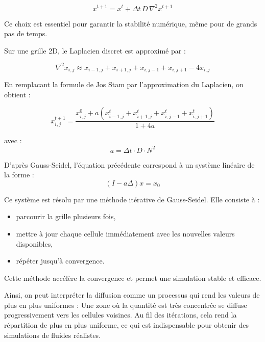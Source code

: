 \documentclass[a4paper]{article}
\begin{document}
\begin{enumerate}
{    \begin{equation*}
    x^{t+1} = x^t + \Delta t \, D \, \nabla^2 x^{t+1}
    \end{equation*}

    Ce choix est essentiel pour garantir la stabilité numérique, même pour de grands pas de temps.
    
    Sur une grille 2D, le Laplacien discret est approximé par :

    \begin{equation*}
    \nabla^2 x_{i,j} \approx x_{i-1,j} + x_{i+1,j} + x_{i,j-1} + x_{i,j+1} - 4x_{i,j}
    \end{equation*}

    En remplacant la formule de Jos Stam par l'approximation du Laplacien, on obtient :

    \begin{equation*}
    x_{i,j}^{t+1} =
    \frac{x_{i,j}^{0} + a \left(
    x_{i-1,j}^{t} + x_{i+1,j}^{t} + x_{i,j-1}^{t} + x_{i,j+1}^{t}
    \right)}{1 + 4a}
    \end{equation*}

    avec :
    \begin{equation*}
    a = \Delta t \cdot D \cdot N^2
    \end{equation*}


    D'après Gauss-Seidel, l’équation précédente correspond à un système linéaire de la forme :
    \begin{equation*}
    (I - a \Delta)x = x_0
    \end{equation*}

    Ce système est résolu par une méthode itérative de Gauss-Seidel. Elle consiste à :
    \begin{itemize}
        \item parcourir la grille plusieurs fois,
        \item mettre à jour chaque cellule immédiatement avec les nouvelles valeurs disponibles,
        \item répéter jusqu’à convergence.
    \end{itemize}

    Cette méthode accélère la convergence et permet une simulation stable et efficace.

    Ainsi, on peut interpréter la diffusion comme un processus qui rend les valeurs de plus en plus uniformes : 
    Une zone où la quantité est très concentrée se diffuse progressivement vers les cellules voisines. 
    Au fil des itérations, cela rend la répartition de plus en plus uniforme, ce qui est indispensable 
    pour obtenir des simulations de fluides réalistes.

}
\end{enumerate}
\end{document}
